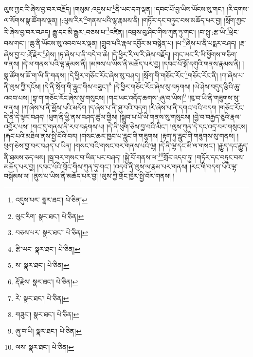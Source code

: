 ལུས་ཀྱང་རི་ཞེས་བྱ་བར་བརྗོད། །གསུམ་:འདུས་པ་\footnote{འདུས་པར་  སྣར་ཐང་།  པེ་ཅིན། }ནི་ཡང་དག་ལྡན། །དབང་པོ་བྱ་ཡིས་ཡོངས་སུ་གང་། །རི་དགས་ལ་སོགས་སྣ་ཚོགས་ལྡན། །:ལུས་རིར་\footnote{ལུང་རིག་  སྣར་ཐང་།  པེ་ཅིན། }གནས་པའི་ལྷ་རྣམས་ནི། །གཏོར་དང་བཏུང་བས་མཆོད་པར་བྱ། །སྲོག་ཀྱང་རི་ཞེས་བྱ་བར་བཤད། རྒྱུ་དང་མི་རྒྱུར་:བཅས་པ་\footnote{བཅས་པར་  སྣར་ཐང་།  པེ་ཅིན། }འཛིན། །འབྲས་བུ་ཤིང་གིས་ཀུན་ཏུ་གང་། །བ་སྤུ་:རྩ་ཡི་\footnote{རྩི་ཡང་  སྣར་ཐང་།  པེ་ཅིན། }ཕྲེང་བས་གང་། །ཆུ་ནི་ཡོངས་སུ་འབབ་པར་ལྡན། །གྲུབ་པའི་རྣལ་འབྱོར་མ་བསྙེན་པ། །པ་\footnote{ས་  སྣར་ཐང་།  པེ་ཅིན། }ཞེས་པ་ནི་པདྨར་བཤད། །རྦ་ཞེས་བྱ་བ་:རྡོ་རྗེར་\footnote{རྡོ་རྗེས་  སྣར་ཐང་།  པེ་ཅིན། }ཤེས། །ཏ་ཞེས་པ་ནི་བདེ་བ་ཆེ། །དེ་ཕྱིར་རི་ལ་རི་ཞེས་བརྗོད། །གང་ཡང་རི་ཡི་ཕྱོགས་གཅིག་གནས། །དེ་ལ་གནས་པའི་ལྷ་རྣམས་ནི། །མཁས་པ་ཡིས་ནི་མཆོད་པར་བྱ། །དབང་པོ་སྒོ་དགུའི་གནས་རྣམས་ནི། །སྣ་ཚོགས་ཆོ་ག་ཡི་ནི་གནས། །དེ་ཕྱིར་གཅོང་རོང་ཞེས་སུ་བཤད། །སྲོག་གི་གཅོང་རོང་\footnote{རེ་  སྣར་ཐང་།  པེ་ཅིན། }གཅོང་རོང་ནི། །ཀ་ཞེས་པ་ནི་ལུས་ཀྱི་དངོས། །དེ་ནི་སྲོག་གི་རླུང་གིས་བཟུང་།\footnote{གཟུང་།  སྣར་ཐང་།  པེ་ཅིན། } །དེ་ཕྱིར་གཅོང་རོང་ཞེས་སུ་བཏགས། །ཡེ་ཤེས་བདུད་རྩིའི་ཆུ་འབབ་པས། །བྷ་ག་གཅོང་རོང་ཞེས་སུ་གསུངས། །གང་ཡང་འདོད་ཆགས་:ཞུ་བ་ཡིས།\footnote{ཞུ་བ་ཡི།  སྣར་ཐང་།  པེ་ཅིན། } །ཁུ་བ་ཡི་ནི་གཟུགས་སུ་གནས། །ཀ་ཞེས་པ་ནི་མྱོས་པའི་མདོག །ད་ཞེས་པ་ནི་ཞུ་བའི་བདག །རི་ཞེས་པ་ནི་དགའ་བའི་བདག །གཅོང་རོང་དེ་ནི་དེ་ལྟར་བཤད། །ཕུག་ནི་ཕྱི་ནས་བཤད་ཚུལ་གྱིས། །སྒྲུབ་པ་པོ་ཡི་གནས་སུ་གསུངས། །བྱེ་བ་བརྒྱད་ཅུའི་རྣལ་འབྱོར་པས། །གང་དུ་གནས་ནི་རབ་བརྟགས་པ། །དེ་ནི་ཕུག་ཅེས་བྱ་བའི་མིང་། །ལུས་ཀུན་དེ་དང་འདྲ་བར་གསུངས། །རྐང་པའི་མཐིལ་ནས་སྤྱི་བོའི་བར། །གསང་ཆར་ཁྱབ་པ་རླུང་གི་གཟུགས། །རྟག་ཏུ་རླུང་གི་གཟུགས་སུ་གནས། །ཕུག་ཅེས་བྱ་བར་བཤད་པ་ཡིན། །གསང་བའི་གསང་བར་གནས་པའི་ལྷ། །དེ་ནི་ལྷ་དང་མི་ལ་གསང་། །རྒྱུད་དང་རྒྱུད་ནི་ཐམས་ཅད་ལས། །སྦ་བར་གསང་བ་ཡིན་པར་བཤད། །སྐྱེ་བོ་གནས་ལ་\footnote{ལས་  སྣར་ཐང་།  པེ་ཅིན། }གྲོང་འདབ་ཏུ། །གཏོར་དང་བཏུང་བས་མཆོད་པར་བྱ། །དབང་པོའི་གྲོང་གིས་ཀུན་ཏུ་གང་། །འདབ་ནི་ལུས་ལ་རྣམ་པར་གནས། །རང་གི་བདག་པོའི་ལྷ་བསྒོམས་ལ། །ནུས་པ་ཡིས་ནི་མཆོད་པར་བྱ། །ལུས་ཀྱི་གྲོང་ཁྱེར་སྤྱི་བོར་གནས། །
